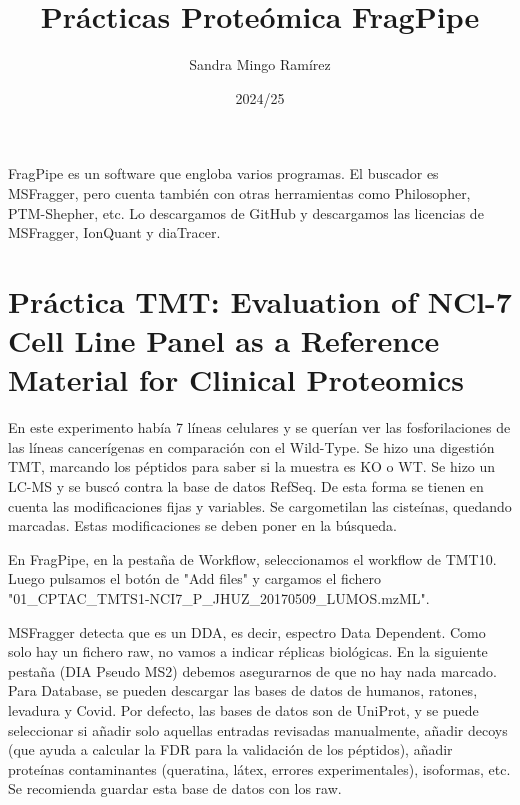 \documentclass[nochap]{config/ejercicios}
\title{Prácticas Proteómica FragPipe}
\author{Sandra Mingo Ramírez}
\date{2024/25}
\begin{document}
\maketitle

\tableofcontents

\newpage

FragPipe es un software que engloba varios programas. El buscador es MSFragger, pero cuenta también con otras herramientas como Philosopher, PTM-Shepher, etc. Lo descargamos de GitHub y descargamos las licencias de MSFragger, IonQuant y diaTracer. 

\section{Práctica TMT: Evaluation of NCl-7 Cell Line Panel as a Reference Material for Clinical Proteomics}
En este experimento había 7 líneas celulares y se querían ver las fosforilaciones de las líneas cancerígenas en comparación con el Wild-Type. Se hizo una digestión TMT, marcando los péptidos para saber si la muestra es KO o WT. Se hizo un LC-MS y se buscó contra la base de datos RefSeq. De esta forma se tienen en cuenta las modificaciones fijas y variables. Se cargometilan las cisteínas, quedando marcadas. Estas modificaciones se deben poner en la búsqueda. 

En FragPipe, en la pestaña de Workflow, seleccionamos el workflow de TMT10. Luego pulsamos el botón de "Add files" y cargamos el fichero "01\_CPTAC\_TMTS1-NCI7\_P\_JHUZ\_20170509\_LUMOS.mzML". 

MSFragger detecta que es un DDA, es decir, espectro Data Dependent. Como solo hay un fichero raw, no vamos a indicar réplicas biológicas. En la siguiente pestaña (DIA Pseudo MS2) debemos asegurarnos de que no hay nada marcado. Para Database, se pueden descargar las bases de datos de humanos, ratones, levadura y Covid. Por defecto, las bases de datos son de UniProt, y se puede seleccionar si añadir solo aquellas entradas revisadas manualmente, añadir decoys (que ayuda a calcular la FDR para la validación de los péptidos), añadir proteínas contaminantes (queratina, látex, errores experimentales), isoformas, etc. Se recomienda guardar esta base de datos con los raw. 
\end{document}
